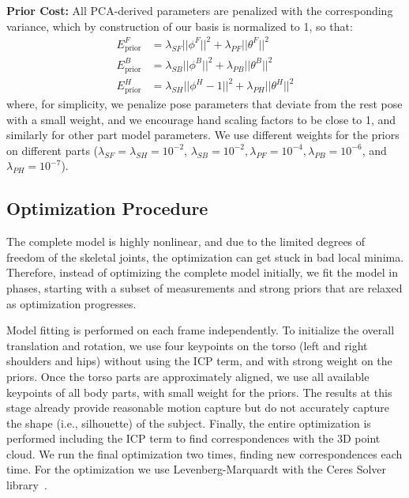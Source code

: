 \documentclass[11pt,english]{article}
\begin{document}
\noindent \textbf{Prior Cost:} 
All PCA-derived parameters are penalized with the corresponding variance, which by construction of our basis is normalized to 1, so that:
\begin{align}
E_\textrm{prior}^F &= \lambda_{SF} ||\phi^F||^2 + \lambda_{PF} ||\theta^F||^2\\
E_\textrm{prior}^B &= \lambda_{SB} ||\phi^B||^2 + \lambda_{PB} ||\theta^B||^2\\
E_\textrm{prior}^H &= \lambda_{SH} ||\phi^H-1||^2 + \lambda_{PH} ||\theta^H||^2
\end{align}
where, for simplicity, we penalize pose parameters that deviate from the rest pose with a small weight, and we encourage hand scaling factors to be close to 1,
and similarly for other part model parameters. We use different weights for the priors on different parts ($\lambda_{SF}=\lambda_{SH}=10^{-2}$, $\lambda_{SB}=10^{-2}, \lambda_{PF}=10^{-4}, \lambda_{PB}=10^{-6}$, and $\lambda_{PH}=10^{-7}$).


\subsection{Optimization Procedure}
The complete model is highly nonlinear, and due to the limited degrees of freedom of the skeletal joints, the optimization can get stuck in bad local minima. 
Therefore, instead of optimizing the complete model initially, we fit the model in phases, starting with a subset of measurements and strong priors that are relaxed as optimization progresses.

Model fitting is performed on each frame independently. To initialize the overall translation and rotation, we use four keypoints on the torso (left and right shoulders and hips) without using the ICP term, and with strong weight on the priors. Once the torso parts are approximately aligned, we use all available keypoints of all body parts, with small weight for the priors. The results at this stage already provide reasonable motion capture but do not accurately capture the shape (i.e., silhouette) of the subject. Finally, the entire optimization is performed including the ICP term to find correspondences with the 3D point cloud. We run the final optimization two times, finding new correspondences each time. For the optimization we use Levenberg-Marquardt with the Ceres Solver library~\cite{ceres-solver}. 
\end{document}
